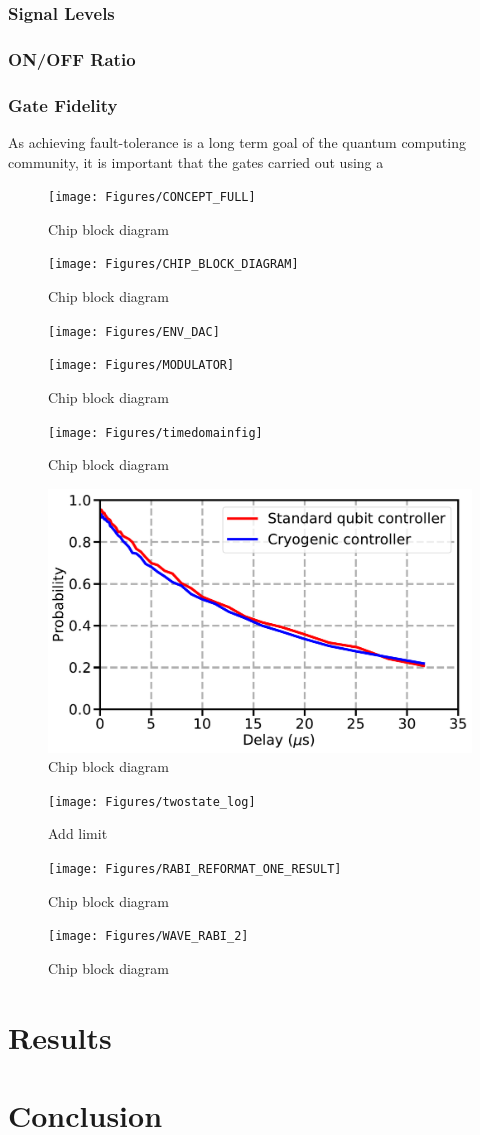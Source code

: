 \documentclass{IEEEtran}
\begin{document}
\subsubsection{Signal Levels}
\subsubsection{ON/OFF Ratio}
\subsubsection{Gate Fidelity}
As achieving fault-tolerance is a long term goal of the quantum computing community, it is important that the gates carried out using a  
\begin{figure}[bt!]
\texttt{[image: Figures/CONCEPT\_FULL]}
\caption{\color{red}Chip block diagram}
\end{figure}
\begin{figure}[bt!]
\texttt{[image: Figures/CHIP\_BLOCK\_DIAGRAM]}
\caption{\color{red}Chip block diagram}
\end{figure}
\begin{figure}
\texttt{[image: Figures/ENV\_DAC]}
\end{figure}
\begin{figure}[bt!]
\texttt{[image: Figures/MODULATOR]}
\caption{\color{red}Chip block diagram}
\end{figure}
\begin{figure}[bt!]
\texttt{[image: Figures/timedomainfig]}
\caption{\color{red}Chip block diagram}
\end{figure}
\begin{figure}[bt!]
\includegraphics[width=\columnwidth]{Figures/Coherence}
\caption{\color{red}Chip block diagram}
\end{figure}
\begin{figure}[bt!]
\texttt{[image: Figures/twostate\_log]}
\caption{\color{red}Add limit}
\end{figure}
\begin{figure}[bt!]
\texttt{[image: Figures/RABI\_REFORMAT\_ONE\_RESULT]}
\caption{\color{red}Chip block diagram}
\end{figure}
\begin{figure}[bt!]
\texttt{[image: Figures/WAVE\_RABI\_2]}
\caption{\color{red}Chip block diagram}
\end{figure}
\section{Results}
\section{Conclusion}
\end{document}

